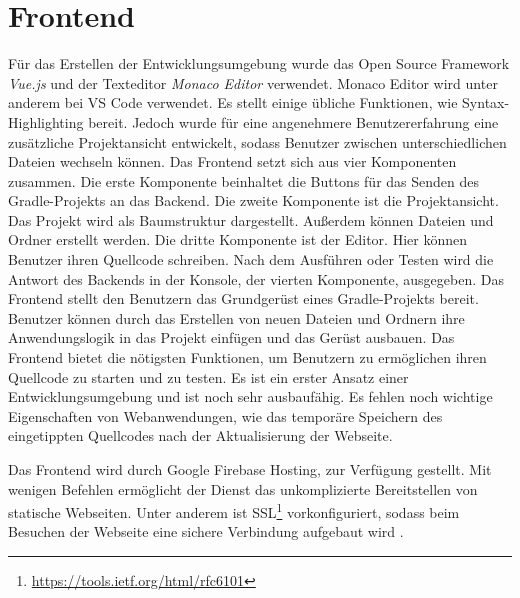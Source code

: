 \section{Frontend}
Für das Erstellen der Entwicklungsumgebung wurde das Open Source Framework \emph{Vue.js}
und der Texteditor \emph{Monaco Editor} verwendet. Monaco Editor wird unter anderem
bei VS Code verwendet. Es stellt einige übliche Funktionen,
wie Syntax-Highlighting \cite{MonacoEditor} bereit.
Jedoch wurde für eine angenehmere Benutzererfahrung eine zusätzliche Projektansicht
entwickelt, sodass Benutzer zwischen unterschiedlichen Dateien wechseln können.
Das Frontend setzt sich aus vier Komponenten zusammen. Die erste Komponente beinhaltet
die Buttons für das Senden des Gradle-Projekts an das Backend. Die zweite Komponente
ist die Projektansicht. Das Projekt wird als Baumstruktur dargestellt. Außerdem können
Dateien und Ordner erstellt werden. Die dritte Komponente ist der Editor. Hier
können Benutzer ihren Quellcode schreiben. Nach dem Ausführen oder Testen wird die Antwort
des Backends in der Konsole, der vierten Komponente, ausgegeben.
Das Frontend stellt den Benutzern das Grundgerüst eines Gradle-Projekts bereit.
Benutzer können durch das Erstellen von neuen Dateien und Ordnern ihre
Anwendungslogik in das Projekt einfügen und das Gerüst ausbauen. Das Frontend bietet
die nötigsten Funktionen, um Benutzern zu ermöglichen ihren Quellcode
zu starten und zu testen. Es ist ein erster Ansatz einer Entwicklungsumgebung
und ist noch sehr ausbaufähig. Es fehlen noch wichtige Eigenschaften von
Webanwendungen, wie das temporäre Speichern des eingetippten Quellcodes nach
der Aktualisierung der Webseite.

Das Frontend wird durch Google Firebase Hosting, zur Verfügung gestellt.
Mit wenigen Befehlen ermöglicht der Dienst das unkomplizierte Bereitstellen von statische Webseiten.
Unter anderem ist SSL\footnote{\url{https://tools.ietf.org/html/rfc6101}}
vorkonfiguriert, sodass beim Besuchen der Webseite eine sichere
Verbindung aufgebaut wird \cite{FirebaseHosting}.


